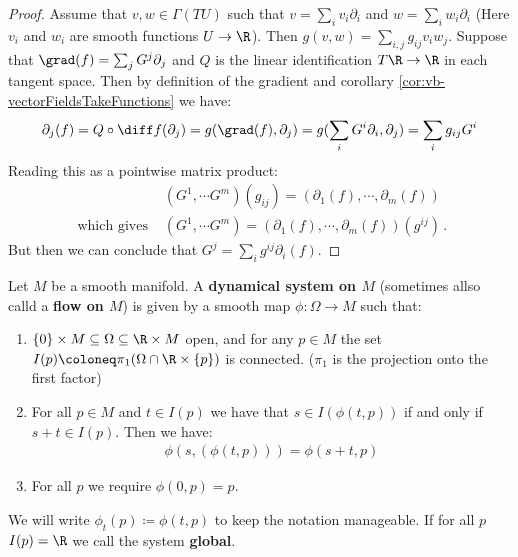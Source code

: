 \begin{proof} Assume that $v,w\in \Gamma( TU)$ such that $v=\sum_i v_i\partial_i$ and $w=\sum_i w_i\partial _i$ (Here $v_i$ and $w_i$ are smooth functions $U\to \R$). Then  $g(v,w)=\sum_{i,j} g_{ij} v_i w_j$.
	Suppose that $\grad(f)=\sum_j G^j \partial_j$ and $Q$ is the linear identification $T\R\to \R$ in each tangent space. Then by definition of the gradient and corollary \ref{cor:vb-vectorFieldsTakeFunctions} we have:
	\begin{align*}
		\partial_j(f)=	Q \circ \diff f (\partial_j)= g(\grad(f),\partial_j)= g(\sum_i G^i \partial_i,\partial_j)=\sum_{i}g_{ij} G^i
	\end{align*} Reading this as a pointwise matrix product:
	\begin{align*}
		&(G^1,\cdots G^m)(g_{ij})=\left(\partial_1 (f),\cdots,\partial_m (f)  \right) \\
		\text{ which gives } &(G^1,\cdots G^m)=\left(\partial_1 (f),\cdots,\partial_m (f)  \right) (g^{ij})\, .
	\end{align*}  But then we can conclude that $G^j=\sum_i g^{ij}\partial_i (f)$.
	
\end{proof}

\begin{definition}
	Let $M$ be a smooth manifold. A \textbf{dynamical system on $M$} (sometimes allso calld a \textbf{flow on $M$}) is given by a smooth map $\phi:\Omega \to M$ such that:
	\begin{enumerate}
		\item $\{0\}\times M \subseteq \Omega \subseteq \R \times M$ open, and for any $p\in M$ the set $I(p)\coloneq \pi_1(\Omega\cap \R\times \{p\})$ is connected. ($\pi_1$ is the projection onto the first factor)
		\item For all $p\in M$ and $t\in I(p)$ we have that $s\in I(\phi(t,p))$ if and only if $s+t\in I(p)$. Then we have:
		\begin{align*}
			\phi(s,(\phi(t,p)))=\phi(s+t,p)
		\end{align*} 
		\item For all $p$ we require $\phi(0,p)=p$. 
	\end{enumerate}
	We will write $\phi_t(p)\coloneq \phi(t,p)$ to keep the notation manageable. 
	If for all $p$ $I(p)=\R$ we call the system \textbf{global}. 
\end{definition}


